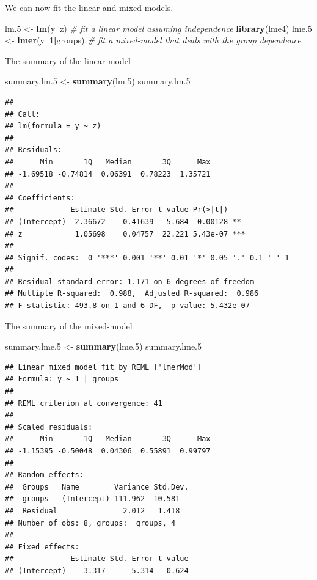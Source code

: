 \documentclass[]{book}
\newenvironment{Shaded}{\begin{snugshade}}{\end{snugshade}}
\newcommand{\KeywordTok}[1]{\textcolor[rgb]{0.13,0.29,0.53}{\textbf{#1}}}
\newcommand{\DecValTok}[1]{\textcolor[rgb]{0.00,0.00,0.81}{#1}}
\newcommand{\StringTok}[1]{\textcolor[rgb]{0.31,0.60,0.02}{#1}}
\newcommand{\CommentTok}[1]{\textcolor[rgb]{0.56,0.35,0.01}{\textit{#1}}}
\newcommand{\OperatorTok}[1]{\textcolor[rgb]{0.81,0.36,0.00}{\textbf{#1}}}
\newcommand{\NormalTok}[1]{#1}
\theoremstyle{definition}
\theoremstyle{definition}
\theoremstyle{definition}
\theoremstyle{remark}
\begin{document}
We can now fit the linear and mixed models.

\begin{Shaded}
\begin{Highlighting}[]
\NormalTok{lm.}\DecValTok{5}\NormalTok{ <-}\StringTok{ }\KeywordTok{lm}\NormalTok{(y}\OperatorTok{~}\NormalTok{z)  }\CommentTok{# fit a linear model assuming independence}
\KeywordTok{library}\NormalTok{(lme4)}
\NormalTok{lme.}\DecValTok{5}\NormalTok{ <-}\StringTok{ }\KeywordTok{lmer}\NormalTok{(y}\OperatorTok{~}\DecValTok{1}\OperatorTok{|}\NormalTok{groups) }\CommentTok{# fit a mixed-model that deals with the group dependence}
\end{Highlighting}
\end{Shaded}

The summary of the linear model

\begin{Shaded}
\begin{Highlighting}[]
\NormalTok{summary.lm.}\DecValTok{5}\NormalTok{ <-}\StringTok{ }\KeywordTok{summary}\NormalTok{(lm.}\DecValTok{5}\NormalTok{)}
\NormalTok{summary.lm.}\DecValTok{5}
\end{Highlighting}
\end{Shaded}

\begin{verbatim}
## 
## Call:
## lm(formula = y ~ z)
## 
## Residuals:
##      Min       1Q   Median       3Q      Max 
## -1.69518 -0.74814  0.06391  0.78223  1.35721 
## 
## Coefficients:
##             Estimate Std. Error t value Pr(>|t|)    
## (Intercept)  2.36672    0.41639   5.684  0.00128 ** 
## z            1.05698    0.04757  22.221 5.43e-07 ***
## ---
## Signif. codes:  0 '***' 0.001 '**' 0.01 '*' 0.05 '.' 0.1 ' ' 1
## 
## Residual standard error: 1.171 on 6 degrees of freedom
## Multiple R-squared:  0.988,  Adjusted R-squared:  0.986 
## F-statistic: 493.8 on 1 and 6 DF,  p-value: 5.432e-07
\end{verbatim}

The summary of the mixed-model

\begin{Shaded}
\begin{Highlighting}[]
\NormalTok{summary.lme.}\DecValTok{5}\NormalTok{ <-}\StringTok{ }\KeywordTok{summary}\NormalTok{(lme.}\DecValTok{5}\NormalTok{)}
\NormalTok{summary.lme.}\DecValTok{5}
\end{Highlighting}
\end{Shaded}

\begin{verbatim}
## Linear mixed model fit by REML ['lmerMod']
## Formula: y ~ 1 | groups
## 
## REML criterion at convergence: 41
## 
## Scaled residuals: 
##      Min       1Q   Median       3Q      Max 
## -1.15395 -0.50048  0.04306  0.55891  0.99797 
## 
## Random effects:
##  Groups   Name        Variance Std.Dev.
##  groups   (Intercept) 111.962  10.581  
##  Residual               2.012   1.418  
## Number of obs: 8, groups:  groups, 4
## 
## Fixed effects:
##             Estimate Std. Error t value
## (Intercept)    3.317      5.314   0.624
\end{verbatim}
\end{document}
